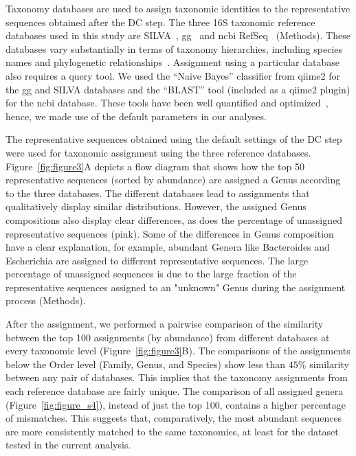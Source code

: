   Taxonomy databases are used to assign taxonomic identities to the representative sequences obtained after the DC step.
  The three 16S taxonomic reference databases used in this study are SILVA~\cite{Quast2012}, \ac{gg}~\cite{DeSantis2006} and \ac{ncbi} RefSeq~\cite{Sayers2009} (Methods).
  These databases vary substantially in terms of taxonomy hierarchies, including species names and phylogenetic relationships~\cite{Balvociute2017}.
  Assignment using a particular database also requires a query tool.
  We used the ``Naive Bayes'' classifier from \ac{qiime2} for the \ac{gg} and SILVA databases and the ``BLAST'' tool (included as a \ac{qiime2} plugin) for the \ac{ncbi} database.
  These tools have been well quantified and optimized~\cite{bokulichOptimizingTaxonomicClassification2018}, hence, we made use of the default parameters in our analyses.

  The representative sequences obtained using the default settings of the DC step were used for taxonomic assignment using the three reference databases.
  Figure~\ref{fig:figure3}A depicts a flow diagram that shows how the top 50 representative sequences (sorted by abundance) are assigned a Genus according to the three databases.
  The different databases lead to assignments that qualitatively display similar distributions. However, the assigned Genus compositions also display clear differences, as does the percentage of unassigned representative sequences (pink).
  Some of the differences in Genus composition have a clear explanation, for example, abundant Genera like Bacteroides and Escherichia are assigned to different representative sequences.
  The large percentage of unassigned sequences is due to the large fraction of the representative sequences assigned to an "unknown" Genus during the assignment process (Methods).

  After the assignment, we performed a pairwise comparison of the similarity between the top 100 assignments (by abundance) from different databases at every taxonomic level (Figure~\ref{fig:figure3}B).
  The comparisons of the assignments below the Order level (Family, Genus, and Species) show less than $45\%$ similarity between any pair of databases.
  This implies that the taxonomy assignments from each reference database are fairly unique.
  The comparison of all assigned genera (Figure~\ref{fig:figure_s4}), instead of just the top 100, contains a higher percentage of mismatches.
  This suggests that, comparatively, the most abundant sequences are more consistently matched to the same taxonomies, at least for the dataset tested in the current analysis.

